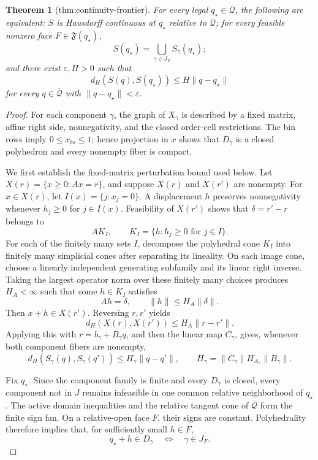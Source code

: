\documentclass{article}
\newtheorem{theorem}{Theorem}
\begin{document}
\begin{theorem}[thm:continuity-frontier]\label{thm:continuity-frontier}
For every legal \(q_\star\in\overline{\mathcal Q}\), the following are equivalent: \(S\) is Hausdorff continuous at \(q_\star\) relative to \(\overline{\mathcal Q}\); for every feasible nonzero face \(F\in\mathfrak F(q_\star)\), \[S(q_\star)=\bigcup_{\gamma\in J_F}S_\gamma(q_\star);\] and there exist \(\varepsilon,H>0\) such that \[d_H(S(q),S(q_\star))\le H\|q-q_\star\|\] for every \(q\in\overline{\mathcal Q}\) with \(\|q-q_\star\|<\varepsilon\).
\end{theorem}
\begin{proof}
For each component \(\gamma\), the graph of \(X_\gamma\) is described by a fixed matrix, affine right side, nonnegativity, and the closed order-cell restrictions.  The bin rows imply \(0\le x_{bs}\le1\); hence projection in \(x\) shows that \(D_\gamma\) is a closed polyhedron and every nonempty fiber is compact.

We first establish the fixed-matrix perturbation bound used below.  Let \(X(r)=\{x\ge0:Ax=r\}\), and suppose \(X(r)\) and \(X(r')\) are nonempty.  For \(x\in X(r)\), let \(I(x)=\{j:x_j=0\}\).  A displacement \(h\) preserves nonnegativity whenever \(h_j\ge0\) for \(j\in I(x)\).  Feasibility of \(X(r')\) shows that \(\delta=r'-r\) belongs to
\[
A K_I,\qquad K_I=\{h:h_j\ge0\text{ for }j\in I\}.
\]
For each of the finitely many sets \(I\), decompose the polyhedral cone \(K_I\) into finitely many simplicial cones after separating its lineality.  On each image cone, choose a linearly independent generating subfamily and its linear right inverse.  Taking the largest operator norm over these finitely many choices produces \(H_A<\infty\) such that some \(h\in K_I\) satisfies
\[
Ah=\delta,\qquad \|h\|\le H_A\|\delta\|.
\]
Then \(x+h\in X(r')\).  Reversing \(r,r'\) yields
\[
d_H(X(r),X(r'))\le H_A\|r-r'\|.
\]
Applying this with \(r=b_\gamma+B_\gamma q\), and then the linear map \(C_\gamma\), gives, whenever both component fibers are nonempty,
\[
d_H(S_\gamma(q),S_\gamma(q'))
\le H_\gamma\|q-q'\|,\qquad
H_\gamma=\|C_\gamma\|H_{A_\gamma}\|B_\gamma\|.
\tag{1}
\]

Fix \(q_\star\).  Since the component family is finite and every \(D_\gamma\) is closed, every component not in \(J\) remains infeasible in one common relative neighborhood of \(q_\star\).  The active domain inequalities and the relative tangent cone of \(\overline{\mathcal Q}\) form the finite sign fan.  On a relative-open face \(F\), their signs are constant.  Polyhedrality therefore implies that, for sufficiently small \(h\in F\),
\[
q_\star+h\in D_\gamma\quad\Longleftrightarrow\quad \gamma\in J_F.
\tag{2}
\]


\end{proof}
\end{document}
